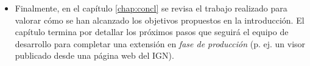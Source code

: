 \begin{prologo}
\begin{itemize}
\item Finalmente, en el capítulo \ref{chap:concl} se revisa el trabajo realizado para valorar cómo se han alcanzado los objetivos propuestos en la introducción. El capítulo termina por detallar los próximos pasos que seguirá el equipo de desarrollo para completar una extensión en \textit{fase de producción} (p. ej. un visor publicado desde una página web del IGN).
\end{itemize}



\end{prologo}
